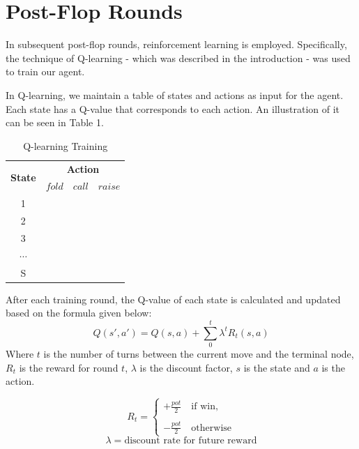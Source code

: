 \documentclass{article}
\begin{document}
\section{Post-Flop Rounds}

In subsequent post-flop rounds, reinforcement learning is employed. Specifically, the technique of Q-learning - which was described in the introduction - was used to train our agent.

In Q-learning, we maintain a table of states and actions as input for the agent. Each state has a Q-value that corresponds to each action. An illustration of it can be seen in Table 1.

\begin{table}[h!]
  \begin{center}
	\begin{tabular}{ c|c|c|c }
	\hline
	\multirow{2}{*}{\textbf{State}}&\multicolumn{3}{|c}{\textbf{Action}}\\
	\cline{2-4}
	& $fold$ & $call$ & $raise$\\ 
	\hline
	1\\
	2\\ 
	3\\ 
	$\cdots$\\
	S\\
	\hline
	\end{tabular}
	\caption{Q-learning Training}
    \label{tab:table1}
  \end{center}
\end{table}
After each training round, the Q-value of each state is calculated and updated based on the formula given below:
\begin{displaymath}
Q\left(s',a'\right)=Q\left(s,a\right)+\sum_{0}^{t}\lambda^{t}R_t\left(s,a\right)
\end{displaymath}
Where $t$ is the number of turns between the current move and the terminal node, $R_t$ is the reward for round $t$, $\lambda$ is the discount factor, $s$ is the state and $a$ is the action.

\begin{displaymath}
  R_t=
  \left\lbrace
  \begin{array}{l}
    +\frac{pot}{2}\quad\text{if win,} \\
    \\
    -\frac{pot}{2}\quad\text{otherwise}
  \end{array}
  \right.
\end{displaymath}
\begin{displaymath}
  \lambda=\text{discount rate for future reward}
\end{displaymath}
\end{document}
